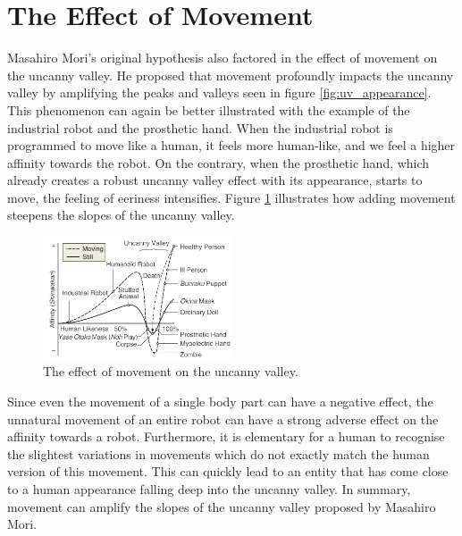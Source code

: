 \section{The Effect of Movement}
Masahiro Mori's original hypothesis \cite{original_masahiro} also factored in the effect of movement on the uncanny valley. He proposed that movement profoundly impacts the uncanny valley by amplifying the peaks and valleys seen in figure \ref{fig:uv_appearance}. This phenomenon can again be better illustrated with the example of the industrial robot and the prosthetic hand. When the industrial robot is programmed to move like a human, it feels more human-like, and we feel a higher affinity towards the robot. On the contrary, when the prosthetic hand, which already creates a robust uncanny valley effect with its appearance, starts to move, the feeling of eeriness intensifies.
Figure \ref{fig:uv_movement} illustrates how adding movement steepens the slopes of the uncanny valley.
\begin{figure} %
    \centering
    \includegraphics[width=0.5\textwidth]{graphics/uv_movement.png}
    \caption{The effect of movement on the uncanny valley.}
    \label{fig:uv_movement}
\end{figure}
Since even the movement of a single body part can have a negative effect, the unnatural movement of an entire robot can have a strong adverse effect on the affinity towards a robot. Furthermore, it is elementary for a human to recognise the slightest variations in movements which do not exactly match the human version of this movement. This can quickly lead to an entity that has come close to a human appearance falling deep into the uncanny valley. In summary, movement can amplify the slopes of the uncanny valley proposed by Masahiro Mori.